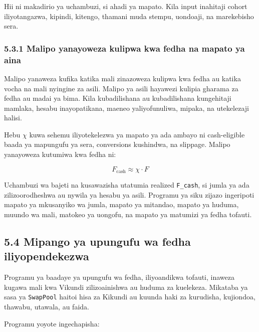 \documentclass[11pt]{article}
\begin{document}
Hii ni makadirio ya uchambuzi, si ahadi ya mapato. Kila input inahitaji cohort iliyotangazwa, kipindi, kitengo, thamani muda stempu, uondoaji, na marekebisho sera.

\subsubsection*{5.3.1 Malipo yanayoweza kulipwa kwa fedha na mapato ya aina}

Malipo yanaweza kufika katika mali zinazoweza kulipwa kwa fedha au katika vocha na mali nyingine za asili. Malipo ya asili hayawezi kulipia gharama za fedha au madai ya bima. Kila kubadilishana au kubadilishana kungehitaji mamlaka, hesabu inayopatikana, maeneo yaliyofunuliwa, mipaka, na utekelezaji halisi.

Hebu \texttt{$\chi$} kuwa sehemu iliyotekelezwa ya mapato ya ada ambayo ni cash-eligible baada ya mapungufu ya sera, conversions kushindwa, na slippage. Malipo yanayoweza kutumiwa kwa fedha ni:

\[
F_{\mathrm{cash}} \approx \chi \cdot F
\]

Uchambuzi wa bajeti na kusawazisha utatumia realized \texttt{F\_cash}, si jumla ya ada zilizoorodheshwa au nywila ya hesabu ya asili. Programu ya siku zijazo ingeripoti mapato ya mkusanyiko wa jumla, mapato ya mitandao, mapato ya huduma, muundo wa mali, matokeo ya uongofu, na mapato ya matumizi ya fedha tofauti.

\subsection*{5.4 Mipango ya upungufu wa fedha iliyopendekezwa}

Programu ya baadaye ya upungufu wa fedha, iliyoandikwa tofauti, inaweza kugawa mali kwa Vikundi zilizoainishwa au huduma za kuelekeza. Mikataba ya sasa ya \texttt{SwapPool} haitoi hisa za Kikundi au kuunda haki za kurudisha, kujiondoa, thawabu, utawala, au faida.

Programu yoyote ingechapisha:
\end{document}
